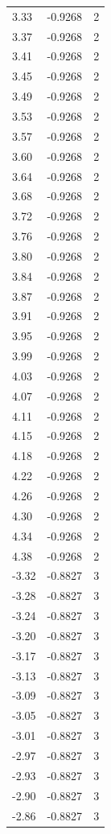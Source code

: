 \begin{longtable}{lrr}
  3.33 & -0.9268 & 2 \\
  3.37 & -0.9268 & 2 \\
  3.41 & -0.9268 & 2 \\
  3.45 & -0.9268 & 2 \\
  3.49 & -0.9268 & 2 \\
  3.53 & -0.9268 & 2 \\
  3.57 & -0.9268 & 2 \\
  3.60 & -0.9268 & 2 \\
  3.64 & -0.9268 & 2 \\
  3.68 & -0.9268 & 2 \\
  3.72 & -0.9268 & 2 \\
  3.76 & -0.9268 & 2 \\
  3.80 & -0.9268 & 2 \\
  3.84 & -0.9268 & 2 \\
  3.87 & -0.9268 & 2 \\
  3.91 & -0.9268 & 2 \\
  3.95 & -0.9268 & 2 \\
  3.99 & -0.9268 & 2 \\
  4.03 & -0.9268 & 2 \\
  4.07 & -0.9268 & 2 \\
  4.11 & -0.9268 & 2 \\
  4.15 & -0.9268 & 2 \\
  4.18 & -0.9268 & 2 \\
  4.22 & -0.9268 & 2 \\
  4.26 & -0.9268 & 2 \\
  4.30 & -0.9268 & 2 \\
  4.34 & -0.9268 & 2 \\
  4.38 & -0.9268 & 2 \\
  -3.32 & -0.8827 & 3 \\
  -3.28 & -0.8827 & 3 \\
  -3.24 & -0.8827 & 3 \\
  -3.20 & -0.8827 & 3 \\
  -3.17 & -0.8827 & 3 \\
  -3.13 & -0.8827 & 3 \\
  -3.09 & -0.8827 & 3 \\
  -3.05 & -0.8827 & 3 \\
  -3.01 & -0.8827 & 3 \\
  -2.97 & -0.8827 & 3 \\
  -2.93 & -0.8827 & 3 \\
  -2.90 & -0.8827 & 3 \\
  -2.86 & -0.8827 & 3 \\

\end{longtable}
